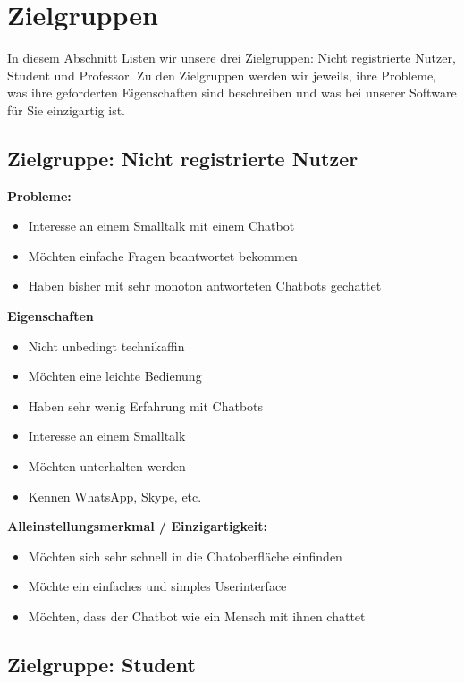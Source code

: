 \section{Zielgruppen}
In diesem Abschnitt Listen wir unsere drei Zielgruppen: Nicht registrierte Nutzer, Student und Professor.
Zu den Zielgruppen werden wir jeweils, ihre Probleme, was ihre geforderten Eigenschaften sind beschreiben und was bei unserer Software für Sie 
einzigartig ist.


\subsection{Zielgruppe: Nicht registrierte Nutzer}

\textbf{Probleme:}
\begin{itemize}
    \item Interesse an einem Smalltalk mit einem Chatbot
    \item Möchten einfache Fragen beantwortet bekommen
    \item Haben bisher mit sehr monoton antworteten Chatbots gechattet
\end{itemize}
\medskip

\textbf{Eigenschaften}
\begin{itemize}
    \item Nicht unbedingt technikaffin
    \item Möchten eine leichte Bedienung
    \item Haben sehr wenig Erfahrung mit Chatbots
    \item Interesse an einem Smalltalk
    \item Möchten unterhalten werden
    \item Kennen WhatsApp, Skype, etc.
\end{itemize}
\medskip

\textbf{Alleinstellungsmerkmal / Einzigartigkeit:}
\begin{itemize}
    \item Möchten sich sehr schnell in die Chatoberfläche einfinden
    \item Möchte ein einfaches und simples Userinterface
    \item Möchten, dass der Chatbot wie ein Mensch mit ihnen chattet
\end{itemize}

\newpage
\subsection{Zielgruppe: Student}

